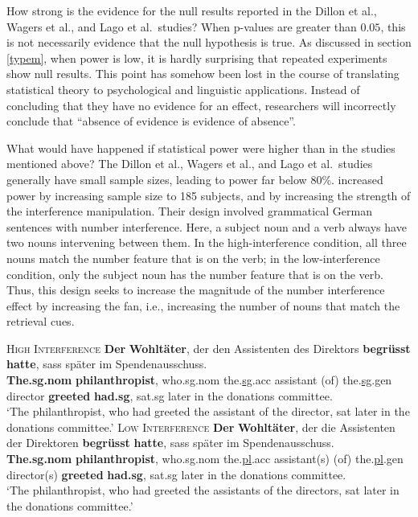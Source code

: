 \documentclass{cambridge7A}\usepackage[]{graphicx}\usepackage[]{color}
\begin{document}
How strong is the evidence for the null results reported in the Dillon et al., Wagers et al., and Lago et al.\ studies? When  p-values are greater than $0.05$, this is not necessarily evidence that the null hypothesis is true. As  discussed in section \ref{typem}, when  power is low, it is hardly surprising that repeated experiments show null results. This point has somehow been lost in the course of translating statistical theory to  psychological and linguistic applications. Instead of concluding that they have no evidence for an effect, researchers will incorrectly conclude that ``absence of evidence is evidence of absence''. 

What would have happened if statistical power were higher than in the studies mentioned above? The Dillon et al., Wagers et al., and Lago et al.\  studies generally have small sample sizes, leading to power far below 80\%. 
 \cite{nicenboimexploratory} increased power by increasing sample size to 185 subjects, and by increasing the strength of the interference manipulation. Their design involved grammatical German sentences with number interference. Here, a subject noun and a verb always have two nouns intervening between them. In the high-interference condition, all three nouns match the number  feature that is on the verb; in the low-interference condition, only the subject noun has the number feature that is on the verb. Thus, this design seeks to increase the magnitude of the number interference effect by increasing the  fan, i.e., increasing the number of nouns that match the retrieval cues.

 \begin{exe}
    \ex  \label{ex:brunoexp1}
    \begin{xlist}
        \ex \textsc{High Interference} \label{ex:brunoHI}
        \gll \textbf{Der} \textbf{Wohlt\"ater}, der den Assistenten {} des
        Direktors \textbf{begr\"usst} \textbf{hatte}, sass sp\"ater im
        Spendenausschuss.\\
        \textbf{The.sg.nom} \textbf{philanthropist}, who.sg.nom
        the.\underline{sg}.acc assistant (of) the.\underline{sg}.gen director
        \textbf{greeted} \textbf{had.sg}, sat.sg {later} {in the} {donations
        committee}.\\
        \glt ‘The philanthropist, who had greeted the assistant of the director,
        sat later in the donations committee.'
        \ex \textsc{Low Interference} \label{ex:brunoLI}
        \gll \textbf{Der} \textbf{Wohlt\"ater}, der die Assistenten {} der
        Direktoren  \textbf{begr\"usst} \textbf{hatte}, sass sp\"ater im
        Spendenausschuss.\\
        \textbf{The.sg.nom} \textbf{philanthropist}, who.sg.nom
        the.\underline{pl}.acc assistant(s) (of) the.\underline{pl}.gen
        director(s) \textbf{greeted} \textbf{had.sg}, sat.sg {later} {in the}
        {donations committee}.\\
        \glt ‘The philanthropist, who had greeted the assistants of the
        directors, sat later in the donations committee.'
    \end{xlist}
\end{exe}
\end{document}
